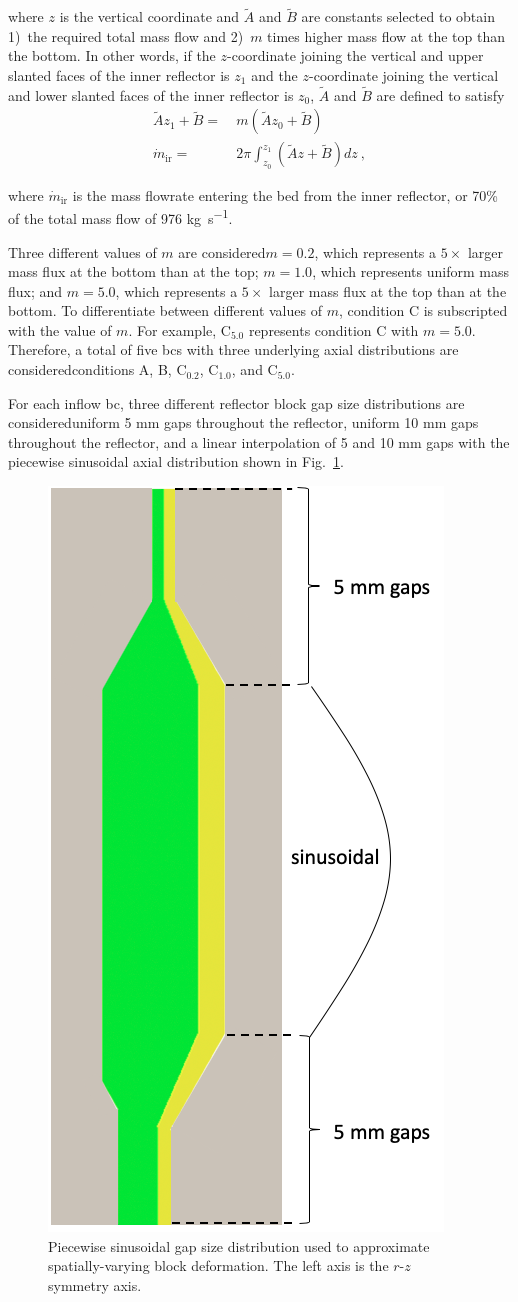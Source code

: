 \noindent where \(z\) is the vertical coordinate and \(\tilde{A}\) and \(\tilde{B}\) are constants selected to obtain 1)~the required total mass flow and 2)~\(m\) times higher mass flow at the top than the bottom. In other words, if the $z$-coordinate joining the vertical and upper slanted faces of the inner reflector is \(z_1\) and the $z$-coordinate joining the vertical and lower slanted faces of the inner reflector is \(z_0\), \(\tilde{A}\) and \(\tilde{B}\) are defined to satisfy
\begin{subequations}
\begin{align}
\label{eq:MFBC1}
\tilde{A}z_1+\tilde{B}=&\ m\left(\tilde{A}z_0+\tilde{B}\right)\\
\dot{m}_\text{ir}=&\ 2\pi\int_{z_0}^{z_1}\left(\tilde{A}z+\tilde{B}\right)dz\ ,
\end{align}
\end{subequations}

\noindent where \(\dot{m}_\text{ir}\) is the mass flowrate entering the bed from the inner reflector, or 70\% of the total mass flow of 976 \si{\kilo\gram\per\second}.

Three different values of \(m\) are considered\mdash \(m=0.2\), which represents a \(5\times\) larger mass flux at the bottom than at the top; \(m=1.0\), which represents uniform mass flux; and \(m=5.0\), which represents a \(5\times\) larger mass flux at the top than at the bottom. To differentiate between different values of \(m\), condition C is subscripted with the value of \(m\). For example, C$_{5.0}$ represents condition C with \(m=5.0\). Therefore, a total of five \glspl{bc} with three underlying axial distributions are considered\mdash conditions A, B, C$_\text{0.2}$, C$_\text{1.0}$, and C$_\text{5.0}$.

For each inflow \gls{bc}, three different reflector block gap size distributions are considered\mdash uniform 5 \si{\milli\meter} gaps throughout the reflector, uniform 10 \si{\milli\meter} gaps throughout the reflector, and a linear interpolation of 5 and 10 \si{\milli\meter} gaps with the piecewise sinusoidal axial distribution shown in Fig.\ \ref{fig:axial_gaps}. 

\begin{figure}[h!]
\centering
\hspace{1.5cm}
\includegraphics[width=0.255\linewidth]{figs/axial_gaps.png}
\caption{Piecewise sinusoidal gap size distribution used to approximate spatially-varying block deformation. The left axis is the $r$-$z$ symmetry axis.}
\label{fig:axial_gaps}
\end{figure}

